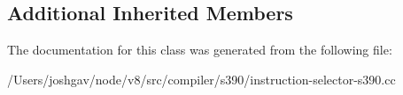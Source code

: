 \subsection*{Additional Inherited Members}


The documentation for this class was generated from the following file\+:\begin{DoxyCompactItemize}
\item 
/\+Users/joshgav/node/v8/src/compiler/s390/instruction-\/selector-\/s390.\+cc\end{DoxyCompactItemize}
